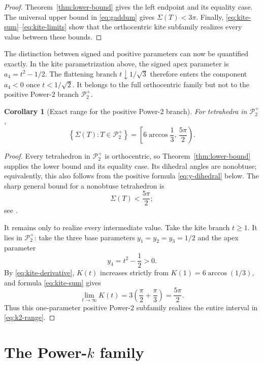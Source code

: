 \documentclass[11pt,a4paper]{article}
\newtheorem{corollary}[theorem]{Corollary}
\theoremstyle{definition}
\theoremstyle{remark}
\begin{document}
\begin{proof}
Theorem~\ref{thm:lower-bound} gives the left endpoint and its equality case.
The universal upper bound in \eqref{eq:gaddum} gives $\Sigma(T)<3\pi$.
Finally, \eqref{eq:kite-sum}--\eqref{eq:kite-limits} show that the
orthocentric kite subfamily realizes every value between these bounds.
\end{proof}

The distinction between signed and positive parameters can now be
quantified exactly.  In the
kite parametrization above, the signed apex parameter is $a_4=t^2-1/2$.
The flattening branch $t\downarrow1/\sqrt3$ therefore enters the component
$a_4<0$ once $t<1/\sqrt2$.  It belongs to the full orthocentric family but
not to the positive Power-$2$ branch $\mathcal P_2^+$.

\begin{corollary}[Exact range for the positive Power-$2$ branch]
\label{cor:k2-range}
For tetrahedra in $\mathcal P_2^+$,
\begin{equation}\label{eq:k2-range}
 \boxed{
 \left\{\Sigma(T):T\in\mathcal P_2^+\right\}
 =\left[6\arccos\frac13,\,\frac{5\pi}{2}\right).
 }
\end{equation}
\end{corollary}

\begin{proof}
Every tetrahedron in $\mathcal P_2^+$ is orthocentric, so
Theorem~\ref{thm:lower-bound} supplies the lower bound and its equality case.
Its dihedral angles are nonobtuse; equivalently, this also follows from the
positive formula \eqref{eq:y-dihedral} below.  The sharp general bound for a
nonobtuse tetrahedron is
\[
 \Sigma(T)<\frac{5\pi}{2};
\]
see \cite[Theorem~3.1, $n=3$]{BrandtsCihangirKrizek2015}.

It remains only to realize every intermediate value.  Take the kite branch
$t\geq1$.  It lies in $\mathcal P_2^+$: take the three base parameters
$y_1=y_2=y_3=1/2$ and the apex parameter
\[
 y_4=t^2-\frac12>0.
\]
By \eqref{eq:kite-derivative}, $K(t)$ increases strictly from
$K(1)=6\arccos(1/3)$, and formula \eqref{eq:kite-sum} gives
\[
 \lim_{t\to\infty}K(t)
 =3\left(\frac\pi2+\frac\pi3\right)=\frac{5\pi}{2}.
\]
Thus this one-parameter positive Power-$2$ subfamily realizes the entire interval in
\eqref{eq:k2-range}.
\end{proof}

\section{\texorpdfstring{The Power-$k$ family}{The Power-k family}}\label{sec:power-family}
\end{document}
